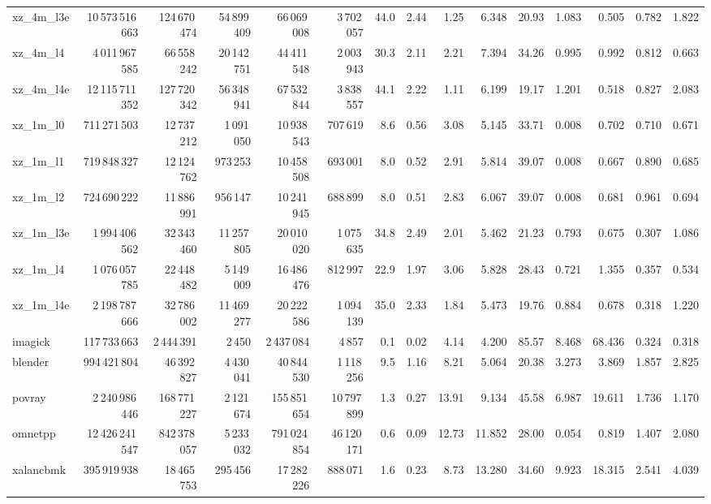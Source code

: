 \documentclass[9pt,landscape,a4paper]{article}
\begin{document}
\begin{adjustbox}{max width=\textwidth, max totalheight=0.50\textheight}
\begin{tabular}{lrrrrrrrrrrrrrr}
xz\_4m\_l3e & 10\,573\,516\,663 & 124\,670\,474 & 54\,899\,409 & 66\,069\,008 & 3\,702\,057 & 44.0 & 2.44 & 1.25 & 6.348 & 20.93 & 1.083 & 0.505 & 0.782 & 1.822 \\
xz\_4m\_l4 & 4\,011\,967\,585 & 66\,558\,242 & 20\,142\,751 & 44\,411\,548 & 2\,003\,943 & 30.3 & 2.11 & 2.21 & 7.394 & 34.26 & 0.995 & 0.992 & 0.812 & 0.663 \\
xz\_4m\_l4e & 12\,115\,711\,352 & 127\,720\,342 & 56\,348\,941 & 67\,532\,844 & 3\,838\,557 & 44.1 & 2.22 & 1.11 & 6.199 & 19.17 & 1.201 & 0.518 & 0.827 & 2.083 \\
xz\_1m\_l0 & 711\,271\,503 & 12\,737\,212 & 1\,091\,050 & 10\,938\,543 & 707\,619 & 8.6 & 0.56 & 3.08 & 5.145 & 33.71 & 0.008 & 0.702 & 0.710 & 0.671 \\
xz\_1m\_l1 & 719\,848\,327 & 12\,124\,762 & 973\,253 & 10\,458\,508 & 693\,001 & 8.0 & 0.52 & 2.91 & 5.814 & 39.07 & 0.008 & 0.667 & 0.890 & 0.685 \\
xz\_1m\_l2 & 724\,690\,222 & 11\,886\,991 & 956\,147 & 10\,241\,945 & 688\,899 & 8.0 & 0.51 & 2.83 & 6.067 & 39.07 & 0.008 & 0.681 & 0.961 & 0.694 \\
xz\_1m\_l3e & 1\,994\,406\,562 & 32\,343\,460 & 11\,257\,805 & 20\,010\,020 & 1\,075\,635 & 34.8 & 2.49 & 2.01 & 5.462 & 21.23 & 0.793 & 0.675 & 0.307 & 1.086 \\
xz\_1m\_l4 & 1\,076\,057\,785 & 22\,448\,482 & 5\,149\,009 & 16\,486\,476 & 812\,997 & 22.9 & 1.97 & 3.06 & 5.828 & 28.43 & 0.721 & 1.355 & 0.357 & 0.534 \\
xz\_1m\_l4e & 2\,198\,787\,666 & 32\,786\,002 & 11\,469\,277 & 20\,222\,586 & 1\,094\,139 & 35.0 & 2.33 & 1.84 & 5.473 & 19.76 & 0.884 & 0.678 & 0.318 & 1.220 \\
imagick & 117\,733\,663 & 2\,444\,391 & 2\,450 & 2\,437\,084 & 4\,857 & 0.1 & 0.02 & 4.14 & 4.200 & 85.57 & 8.468 & 68.436 & 0.324 & 0.318 \\
blender & 994\,421\,804 & 46\,392\,827 & 4\,430\,041 & 40\,844\,530 & 1\,118\,256 & 9.5 & 1.16 & 8.21 & 5.064 & 20.38 & 3.273 & 3.869 & 1.857 & 2.825 \\
povray & 2\,240\,986\,446 & 168\,771\,227 & 2\,121\,674 & 155\,851\,654 & 10\,797\,899 & 1.3 & 0.27 & 13.91 & 9.134 & 45.58 & 6.987 & 19.611 & 1.736 & 1.170 \\
omnetpp & 12\,426\,241\,547 & 842\,378\,057 & 5\,233\,032 & 791\,024\,854 & 46\,120\,171 & 0.6 & 0.09 & 12.73 & 11.852 & 28.00 & 0.054 & 0.819 & 1.407 & 2.080 \\
xalancbmk & 395\,919\,938 & 18\,465\,753 & 295\,456 & 17\,282\,226 & 888\,071 & 1.6 & 0.23 & 8.73 & 13.280 & 34.60 & 9.923 & 18.315 & 2.541 & 4.039 \\

\end{tabular}
\end{adjustbox}
\end{document}
